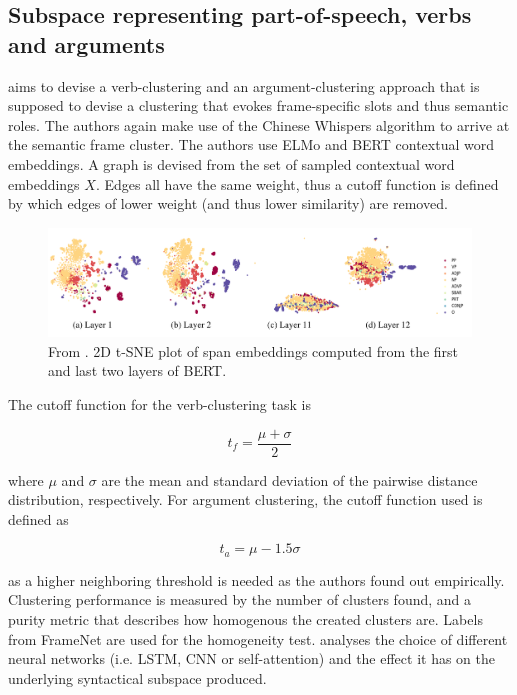 \documentclass[a4paper,12pt,oneside,openright]{report}
\begin{document}
\subsection{Subspace representing part-of-speech, verbs and arguments}

\cite{ribeiro19} aims to devise a verb-clustering and an argument-clustering approach that is supposed to devise a clustering that evokes frame-specific slots and thus semantic roles.
The authors again make use of the Chinese Whispers algorithm
\cite{biemann06} to arrive at the semantic frame cluster.
The authors use ELMo and BERT contextual word embeddings.
A graph is devised from the set of sampled contextual word embeddings $X$.
Edges all have the same weight, thus a cutoff function is defined by which edges of lower weight (and thus lower similarity) are removed.

\begin{figure}
	\center
  \includegraphics[width=0.9\linewidth]{./assets/relatedwork/BERT_tsne_layers.png}
  \caption{From \cite{jawahar19}. 2D t-SNE plot of span embeddings computed from the first and last two layers of BERT.}
  \label{fig:cold_fictional_desired}
\end{figure}

The cutoff function for the verb-clustering task is

\begin{equation}
t_f = \frac{\mu + \sigma}{2}
\end{equation}

where $\mu$ and $\sigma$ are the mean and standard deviation of the pairwise distance distribution, respectively. 
For argument clustering, the cutoff function used is defined as

\begin{equation}
t_a = \mu - 1.5 \sigma
\end{equation}

as a higher neighboring threshold is needed as the authors found out empirically.
Clustering performance is measured by the number of clusters found, and a purity metric that describes how homogenous the created clusters are. 
Labels from FrameNet \cite{baker98} are used for the homogeneity test. 
\cite{peters18} analyses the choice of different neural networks (i.e. LSTM, CNN or self-attention) and the effect it has on the underlying syntactical subspace produced. \\
\end{document}

